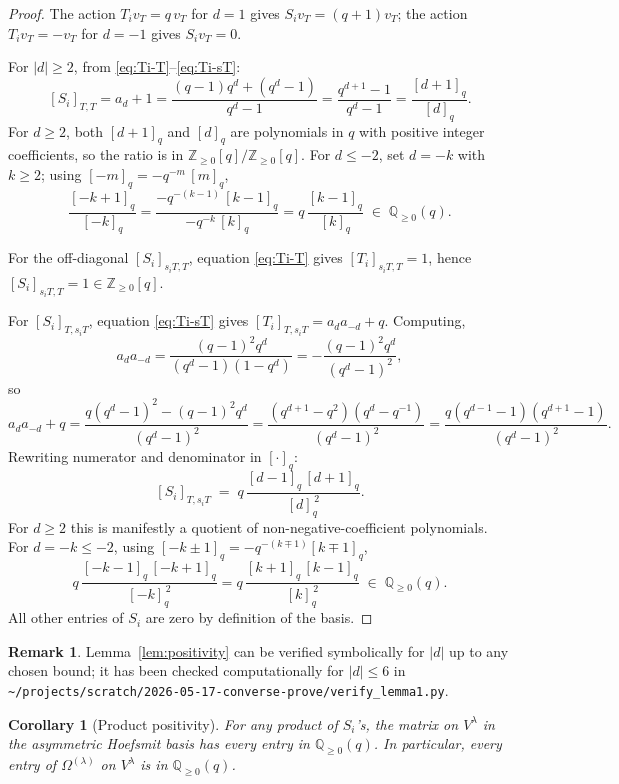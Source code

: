 \documentclass[11pt]{article}
\newtheorem{corollary}[theorem]{Corollary}
\theoremstyle{definition}
\newtheorem{remark}[theorem]{Remark}
\newcommand{\Vlam}{V^{\lambda}}
\newcommand{\Om}{\Omega}
\newcommand{\qint}[1]{[#1]_q}
\begin{document}
\begin{proof}
The action $T_i v_T = q\,v_T$ for $d = 1$ gives $S_i v_T = (q+1) v_T$;
the action $T_i v_T = -v_T$ for $d = -1$ gives $S_i v_T = 0$.

For $|d| \ge 2$, from \eqref{eq:Ti-T}--\eqref{eq:Ti-sT}:
\[
   [S_i]_{T,T} = a_d + 1 = \frac{(q-1)q^d + (q^d - 1)}{q^d - 1}
              = \frac{q^{d+1} - 1}{q^d - 1} = \frac{\qint{d+1}}{\qint{d}}.
\]
For $d \ge 2$, both $\qint{d+1}$ and $\qint{d}$ are polynomials in $q$
with positive integer coefficients, so the ratio is in
$\mathbb{Z}_{\ge 0}[q]/\mathbb{Z}_{\ge 0}[q]$.  For $d \le -2$, set
$d = -k$ with $k \ge 2$; using $\qint{-m} = -q^{-m}\,\qint{m}$,
\[
   \frac{\qint{-k+1}}{\qint{-k}}
   = \frac{-q^{-(k-1)}\,\qint{k-1}}{-q^{-k}\,\qint{k}}
   = q\,\frac{\qint{k-1}}{\qint{k}}
   \;\in\; \mathbb{Q}_{\ge 0}(q).
\]

For the off-diagonal $[S_i]_{s_i T, T}$, equation \eqref{eq:Ti-T} gives
$[T_i]_{s_i T, T} = 1$, hence $[S_i]_{s_i T, T} = 1 \in \mathbb{Z}_{\ge 0}[q]$.

For $[S_i]_{T, s_i T}$, equation \eqref{eq:Ti-sT} gives
$[T_i]_{T, s_i T} = a_d a_{-d} + q$.  Computing,
\[
   a_d a_{-d} = \frac{(q-1)^2 q^d}{(q^d - 1)(1 - q^d)}
              = -\frac{(q-1)^2 q^d}{(q^d-1)^2},
\]
so
\[
   a_d a_{-d} + q
   = \frac{q (q^d - 1)^2 - (q-1)^2 q^d}{(q^d-1)^2}
   = \frac{(q^{d+1} - q^2)(q^d - q^{-1})}{(q^d - 1)^2}
   = \frac{q(q^{d-1} - 1)(q^{d+1} - 1)}{(q^d-1)^2}.
\]
Rewriting numerator and denominator in $\qint{\cdot}$:
\[
   [S_i]_{T, s_i T} \;=\; q\,\frac{\qint{d-1}\,\qint{d+1}}{\qint{d}^{\,2}}.
\]
For $d \ge 2$ this is manifestly a quotient of non-negative-coefficient
polynomials.  For $d = -k \le -2$, using
$\qint{-k\pm 1} = -q^{-(k\mp 1)}\qint{k\mp 1}$,
\[
   q\,\frac{\qint{-k-1}\,\qint{-k+1}}{\qint{-k}^{\,2}}
   = q\,\frac{\qint{k+1}\,\qint{k-1}}{\qint{k}^{\,2}}
   \;\in\; \mathbb{Q}_{\ge 0}(q).
\]
All other entries of $S_i$ are zero by definition of the basis.
\end{proof}

\begin{remark}
Lemma~\ref{lem:positivity} can be verified symbolically for $|d|$ up to
any chosen bound; it has been checked computationally for
$|d| \le 6$ in
\texttt{\textasciitilde/projects/scratch/2026-05-17-converse-prove/verify\_lemma1.py}.
\end{remark}

\begin{corollary}[Product positivity]\label{cor:product-positivity}
For any product of $S_i$'s, the matrix on $\Vlam$ in the asymmetric
Hoefsmit basis has every entry in $\mathbb{Q}_{\ge 0}(q)$.  In
particular, every entry of $\Om^{(\lambda)}$ on $\Vlam$ is in
$\mathbb{Q}_{\ge 0}(q)$.
\end{corollary}
\end{document}
